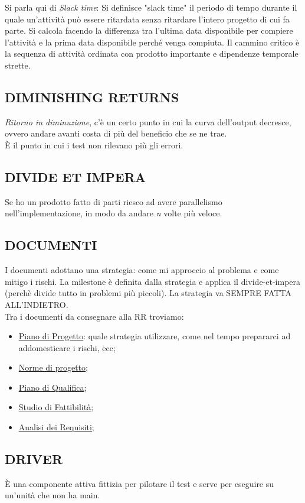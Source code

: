 		Si parla qui di \textit{Slack time}: Si definisce "slack time" il periodo di tempo durante il quale un'attività può essere ritardata senza ritardare l'intero progetto di cui fa parte. Si calcola facendo la differenza tra l'ultima data disponibile per compiere l'attività e la prima data disponibile perché venga compiuta. Il cammino critico è la sequenza di attività ordinata con prodotto importante e dipendenze temporale strette.
		
		\subsection{DIMINISHING RETURNS}		\label{diminishingreturn}	%
		\textit{Ritorno in diminuzione}, c'è un certo punto in cui la curva dell'output decresce, ovvero andare avanti costa di più del beneficio che se ne trae. \\
		È il punto in cui i test non rilevano più gli errori.
		
		\subsection{DIVIDE ET IMPERA}	 \label{divideetimpera}		
		Se ho un prodotto fatto di parti riesco ad avere parallelismo nell'implementazione, in modo da andare \textit{n} volte più veloce.
		
		\subsection{DOCUMENTI}		\label{documenti}
		I documenti adottano una strategia: come mi approccio al problema e come mitigo i rischi. La milestone è definita dalla strategia e applica il divide-et-impera (perchè divide tutto in problemi più piccoli). La strategia va SEMPRE FATTA ALL'INDIETRO. \\
		Tra i documenti da consegnare alla RR troviamo:
		\begin{itemize}
			\item \underline{\hyperref[piano]{Piano di Progetto}}: quale strategia utilizzare, come nel tempo prepararci ad addomesticare i rischi, ecc;
			\item \underline{\hyperref[norme]{Norme di progetto}};
			\item \underline{\hyperref[pianoqualifica]{Piano di Qualifica}};
			\item \underline{\hyperref[studiofattibilita]{Studio di Fattibilità}};
			\item \underline{\hyperref[analisideirequisiti]{Analisi dei Requisiti}};
		\end{itemize} 
	
		\subsection{DRIVER}		\label{driver}
		È una componente attiva fittizia per pilotare il test e serve per eseguire su un'unità che non ha main.
	
